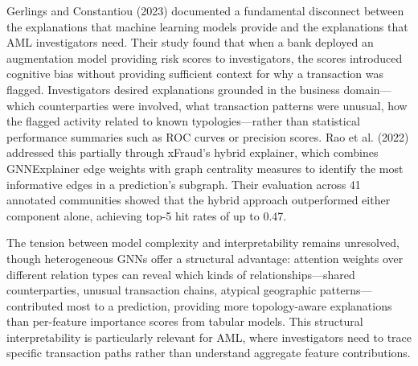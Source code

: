 \documentclass[12pt,a4paper]{article}
\begin{document}
Gerlings and Constantiou (2023) documented a fundamental disconnect between the explanations that machine learning models provide and the explanations that AML investigators need. Their study found that when a bank deployed an augmentation model providing risk scores to investigators, the scores introduced cognitive bias without providing sufficient context for why a transaction was flagged. Investigators desired explanations grounded in the business domain---which counterparties were involved, what transaction patterns were unusual, how the flagged activity related to known typologies---rather than statistical performance summaries such as ROC curves or precision scores. Rao et al. (2022) addressed this partially through xFraud's hybrid explainer, which combines GNNExplainer edge weights with graph centrality measures to identify the most informative edges in a prediction's subgraph. Their evaluation across 41 annotated communities showed that the hybrid approach outperformed either component alone, achieving top-5 hit rates of up to 0.47.

The tension between model complexity and interpretability remains unresolved, though heterogeneous GNNs offer a structural advantage: attention weights over different relation types can reveal which kinds of relationships---shared counterparties, unusual transaction chains, atypical geographic patterns---contributed most to a prediction, providing more topology-aware explanations than per-feature importance scores from tabular models. This structural interpretability is particularly relevant for AML, where investigators need to trace specific transaction paths rather than understand aggregate feature contributions.

\end{document}
